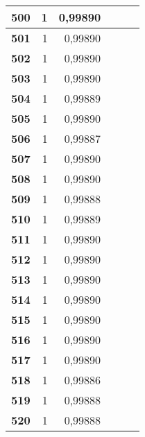 {\begin{longtable}{|r|r|r|l|r|r|}
\textbf{500} & 1 & 0,99890 &  & \multicolumn{1}{l|}{} & \multicolumn{1}{l|}{} \\ \hline
\textbf{501} & 1 & 0,99890 &  & \multicolumn{1}{l|}{} & \multicolumn{1}{l|}{} \\ \hline
\textbf{502} & 1 & 0,99890 &  & \multicolumn{1}{l|}{} & \multicolumn{1}{l|}{} \\ \hline
\textbf{503} & 1 & 0,99890 &  & \multicolumn{1}{l|}{} & \multicolumn{1}{l|}{} \\ \hline
\textbf{504} & 1 & 0,99889 &  & \multicolumn{1}{l|}{} & \multicolumn{1}{l|}{} \\ \hline
\textbf{505} & 1 & 0,99890 &  & \multicolumn{1}{l|}{} & \multicolumn{1}{l|}{} \\ \hline
\textbf{506} & 1 & 0,99887 &  & \multicolumn{1}{l|}{} & \multicolumn{1}{l|}{} \\ \hline
\textbf{507} & 1 & 0,99890 &  & \multicolumn{1}{l|}{} & \multicolumn{1}{l|}{} \\ \hline
\textbf{508} & 1 & 0,99890 &  & \multicolumn{1}{l|}{} & \multicolumn{1}{l|}{} \\ \hline
\textbf{509} & 1 & 0,99888 &  & \multicolumn{1}{l|}{} & \multicolumn{1}{l|}{} \\ \hline
\textbf{510} & 1 & 0,99889 &  & \multicolumn{1}{l|}{} & \multicolumn{1}{l|}{} \\ \hline
\textbf{511} & 1 & 0,99890 &  & \multicolumn{1}{l|}{} & \multicolumn{1}{l|}{} \\ \hline
\textbf{512} & 1 & 0,99890 &  & \multicolumn{1}{l|}{} & \multicolumn{1}{l|}{} \\ \hline
\textbf{513} & 1 & 0,99890 &  & \multicolumn{1}{l|}{} & \multicolumn{1}{l|}{} \\ \hline
\textbf{514} & 1 & 0,99890 &  & \multicolumn{1}{l|}{} & \multicolumn{1}{l|}{} \\ \hline
\textbf{515} & 1 & 0,99890 &  & \multicolumn{1}{l|}{} & \multicolumn{1}{l|}{} \\ \hline
\textbf{516} & 1 & 0,99890 &  & \multicolumn{1}{l|}{} & \multicolumn{1}{l|}{} \\ \hline
\textbf{517} & 1 & 0,99890 &  & \multicolumn{1}{l|}{} & \multicolumn{1}{l|}{} \\ \hline
\textbf{518} & 1 & 0,99886 &  & \multicolumn{1}{l|}{} & \multicolumn{1}{l|}{} \\ \hline
\textbf{519} & 1 & 0,99888 &  & \multicolumn{1}{l|}{} & \multicolumn{1}{l|}{} \\ \hline
\textbf{520} & 1 & 0,99888 &  & \multicolumn{1}{l|}{} & \multicolumn{1}{l|}{} \\ \hline

\end{longtable}}

